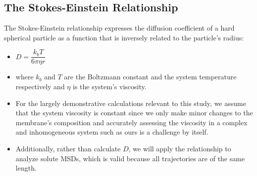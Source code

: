 \documentclass{article}
\begin{document}
%
%
  
  \subsection*{The Stokes-Einstein Relationship}\label{method:stokes}
  
  The Stokes-Einstein relationship expresses the diffusion coefficient of 
  a hard spherical particle as a function that is inversely related to the
  particle's radius:
  \begin{itemize}
  	\item $D = \dfrac{k_bT}{6\pi\eta r}$
  	\item where $k_b$ and $T$ are the Boltzmann	constant and the system 
  	temperature respectively and $\eta$ is the system's viscosity.
  	\item For the largely demonstrative calculations relevant to this study, 
  	we assume that the system viscosity is constant since we only make minor
  	changes to the membrane's composition and accurately assessing the viscosity
  	in a complex and inhomogeneous system such as ours is a challenge by itself.
  	\item Additionally, rather than calculate $D$, we will apply the relationship
  	to analyze solute MSDs, which is valid because all trajectories are of the same
  	length.
  \end{itemize}
  
\end{document}
